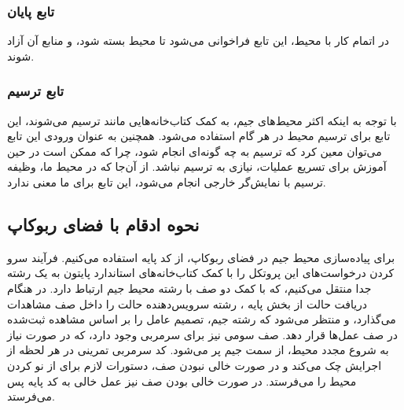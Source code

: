 \subsubsection{تابع پایان}
در اتمام کار با محیط، این تابع فراخوانی می‌شود تا محیط بسته شود، و منابع آن آزاد شوند.
\subsubsection{تابع ترسیم}
با توجه به اینکه اکثر محیط‌های جیم، به کمک کتاب‌خانه‌هایی مانند 
ترسیم می‌شوند، این تابع برای ترسیم محیط در هر گام استفاده می‌شود.
همچنین به عنوان ورودی این تابع می‌توان معین کرد که ترسیم به چه گونه‌ای انجام شود، چرا که ممکن است در حین آموزش برای تسریع عملیات، نیازی به ترسیم نباشد.
از آن‌جا که در محیط ما، وظیفه ترسیم با نمایش‌گر خارجی انجام می‌شود، این تابع برای ما معنی ندارد. 
\subsection{نحوه ادقام با فضای ربوکاپ}
برای پیاده‌سازی محیط جیم در فضای ربوکاپ، از کد پایه  استفاده می‌کنیم.
فرآیند سرو کردن درخواست‌های این پروتکل را با کمک کتاب‌خانه‌های استاندارد پایتون به یک رشته 
جدا منتقل می‌کنیم، که با کمک دو صف با رشته محیط جیم ارتباط دارد.
در هنگام دریافت حالت از بخش پایه ،
رشته سرویس‌دهنده حالت را داخل صف مشاهدات می‌گذارد، و منتظر می‌شود که رشته جیم، تصمیم عامل را بر اساس مشاهده ثبت‌شده در صف عمل‌ها قرار دهد.
صف سومی نیز برای سرمربی وجود دارد، که در صورت نیاز به شروع مجدد محیط، از سمت جیم پر می‌شود. 
کد سرمربی تمرینی در هر لحظه از اجرایش چک می‌کند و در صورت خالی نبودن صف، دستورات لازم برای از نو کردن محیط را می‌فرستد. در صورت خالی بودن صف نیز عمل خالی به کد پایه پس می‌فرستد.

